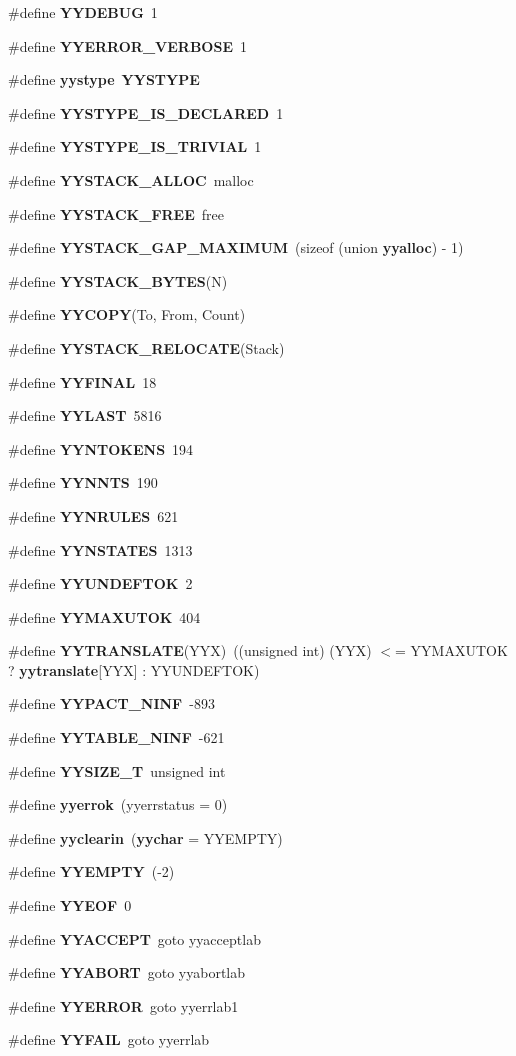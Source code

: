 \begin{CompactItemize}
\#define {\bf YYDEBUG}\ 1
\item 
\#define {\bf YYERROR\_\-VERBOSE}\ 1
\item 
\#define {\bf yystype}\ {\bf YYSTYPE}
\item 
\#define {\bf YYSTYPE\_\-IS\_\-DECLARED}\ 1
\item 
\#define {\bf YYSTYPE\_\-IS\_\-TRIVIAL}\ 1
\item 
\#define {\bf YYSTACK\_\-ALLOC}\ malloc
\item 
\#define {\bf YYSTACK\_\-FREE}\ free
\item 
\#define {\bf YYSTACK\_\-GAP\_\-MAXIMUM}\ (sizeof (union {\bf yyalloc}) - 1)
\item 
\#define {\bf YYSTACK\_\-BYTES}(N)
\item 
\#define {\bf YYCOPY}(To, From, Count)
\item 
\#define {\bf YYSTACK\_\-RELOCATE}(Stack)
\item 
\#define {\bf YYFINAL}\ 18
\item 
\#define {\bf YYLAST}\ 5816
\item 
\#define {\bf YYNTOKENS}\ 194
\item 
\#define {\bf YYNNTS}\ 190
\item 
\#define {\bf YYNRULES}\ 621
\item 
\#define {\bf YYNSTATES}\ 1313
\item 
\#define {\bf YYUNDEFTOK}\ 2
\item 
\#define {\bf YYMAXUTOK}\ 404
\item 
\#define {\bf YYTRANSLATE}(YYX)\ ((unsigned int) (YYX) $<$= YYMAXUTOK ? {\bf yytranslate}[YYX] : YYUNDEFTOK)
\item 
\#define {\bf YYPACT\_\-NINF}\ -893
\item 
\#define {\bf YYTABLE\_\-NINF}\ -621
\item 
\#define {\bf YYSIZE\_\-T}\ unsigned int
\item 
\#define {\bf yyerrok}\ (yyerrstatus = 0)
\item 
\#define {\bf yyclearin}\ ({\bf yychar} = YYEMPTY)
\item 
\#define {\bf YYEMPTY}\ (-2)
\item 
\#define {\bf YYEOF}\ 0
\item 
\#define {\bf YYACCEPT}\ goto yyacceptlab
\item 
\#define {\bf YYABORT}\ goto yyabortlab
\item 
\#define {\bf YYERROR}\ goto yyerrlab1
\item 
\#define {\bf YYFAIL}\ goto yyerrlab

\end{CompactItemize}
